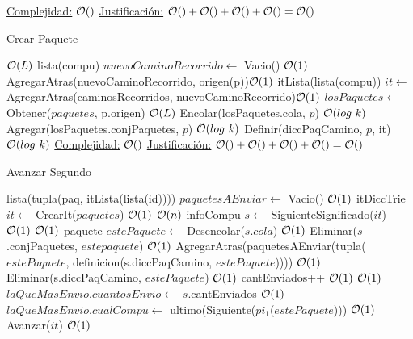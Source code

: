 \begin{Algoritmos}
\begin{algorithm}
\begin{algorithmic}[1]
  \EndProcedure
     \underline{Complejidad:} $\mathcal{O}()$
 \underline{Justificación:} $\mathcal{O}()+\mathcal{O}()+\mathcal{O}()+\mathcal{O}() = \mathcal{O}()$
\end{algorithmic}
\end{algorithm}


\begin{algorithm}
\caption{Crear Paquete}
\begin{algorithmic}[1]
    \Comment $\mathcal{O}(L)$
   \State lista(compu) $nuevoCaminoRecorrido \gets$ Vacio() \Comment $\mathcal{O}(1)$
   \State AgregarAtras(nuevoCaminoRecorrido, origen(p))\Comment  $\mathcal{O}(1)$
   \State itLista(lista(compu)) $it \gets$ AgregarAtras(caminosRecorridos, nuevoCaminoRecorrido)\Comment $\mathcal{O}(1)$
   \State $losPaquetes \gets $ Obtener($paquetes$, p.origen) \Comment $\mathcal{O}(L)$
   \State Encolar(losPaquetes.cola, $p$) \Comment $\mathcal{O}(log \ k)$
   \State Agregar(losPaquetes.conjPaquetes, $p$) \Comment $\mathcal{O}(log \ k)$
   \State Definir(diccPaqCamino, $p$, it) \Comment $\mathcal{O}(log \ k)$
   \EndIf
   \EndProcedure
     \underline{Complejidad:} $\mathcal{O}()$
 \underline{Justificación:} $\mathcal{O}()+\mathcal{O}()+\mathcal{O}()+\mathcal{O}() = \mathcal{O}()$\end{algorithmic}
\end{algorithm}


\begin{algorithm}
\caption{Avanzar Segundo}
\begin{algorithmic}[1]
  
  \State lista(tupla(paq, itLista(lista(id)))) $paquetesAEnviar \gets$ Vacio() \Comment  $\mathcal{O}(1)$
  \State itDiccTrie $it \gets$ CrearIt($paquetes$) \Comment  $\mathcal{O}(1)$
   \Comment $\mathcal{O}(n)$ 
  	\State infoCompu $s \gets$ SiguienteSignificado($it$) \Comment  $\mathcal{O}(1)$ 
  	 \Comment  $\mathcal{O}(1)$
  		\State paquete $estePaquete \gets$ Desencolar($s$.$cola$) \Comment  $\mathcal{O}(1)$
  		\State Eliminar($s$.conjPaquetes, $estepaquete$) \Comment  $\mathcal{O}(1)$
		\State AgregarAtras(paquetesAEnviar(tupla($estePaquete$, definicion(s.diccPaqCamino, $estePaquete$)))) \Comment  $\mathcal{O}(1)$
		\State Eliminar(s.diccPaqCamino, $estePaquete$)  \Comment  $\mathcal{O}(1)$
		\State cantEnviados++ \Comment  $\mathcal{O}(1)$
		 \Comment  $\mathcal{O}(1)$
		   \State $laQueMasEnvio.cuantosEnvio \gets$ $s$.cantEnviados \Comment  $\mathcal{O}(1)$
		   \State $laQueMasEnvio.cualCompu \gets$ ultimo(Siguiente($pi_1$($estePaquete$))) \Comment  $\mathcal{O}(1)$
		\EndIf 
	\EndIf
	\State Avanzar($it$) \Comment  $\mathcal{O}(1)$
  \EndWhile 
   

\end{algorithmic}
\end{algorithm}
\end{Algoritmos}
